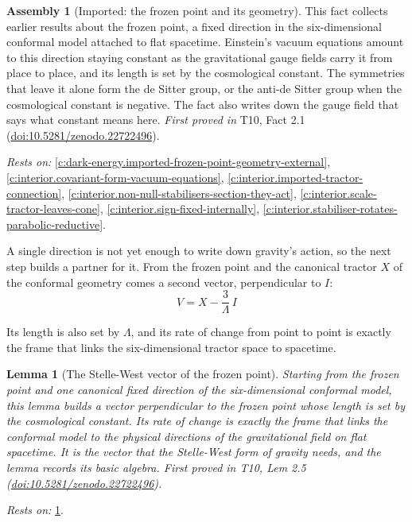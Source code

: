 \documentclass[11pt]{article}
\newtheorem{lemma}[theorem]{Lemma}
\theoremstyle{definition}
\newtheorem{assembled}[theorem]{Assembly}
\theoremstyle{plain}
\begin{document}
\begin{assembled}[Imported: the frozen point and its geometry]\label{c:dark-energy.imported-frozen-point-geometry}
This fact collects earlier results about the frozen point, a fixed direction in the six-dimensional conformal model attached to flat spacetime. Einstein's vacuum equations amount to this direction staying constant as the gravitational gauge fields carry it from place to place, and its length is set by the cosmological constant. The symmetries that leave it alone form the de Sitter group, or the anti-de Sitter group when the cosmological constant is negative. The fact also writes down the gauge field that says what constant means here.
\emph{First proved in} T10, Fact 2.1 (\href{https://doi.org/10.5281/zenodo.22722496}{doi:10.5281/zenodo.22722496}).
\end{assembled}
\noindent\emph{Rests on:} \ref{c:dark-energy.imported-frozen-point-geometry-external}, \ref{c:interior.covariant-form-vacuum-equations}, \ref{c:interior.imported-tractor-connection}, \ref{c:interior.non-null-stabilisers-section-they-act}, \ref{c:interior.scale-tractor-leaves-cone}, \ref{c:interior.sign-fixed-internally}, \ref{c:interior.stabiliser-rotates-parabolic-reductive}.

A single direction is not yet enough to write down gravity's action, so the next step builds a partner for it. From the frozen point and the canonical tractor $X$ of the conformal geometry comes a second vector, perpendicular to $I$: \[ V = X - \frac{3}{\Lambda}\, I \]

Its length is also set by $\Lambda$, and its rate of change from point to point is exactly the frame that links the six-dimensional tractor space to spacetime.

\begin{lemma}[The Stelle-West vector of the frozen point]\label{c:dark-energy.stelle-west-vector-frozen-point}
Starting from the frozen point and one canonical fixed direction of the six-dimensional conformal model, this lemma builds a vector perpendicular to the frozen point whose length is set by the cosmological constant. Its rate of change is exactly the frame that links the conformal model to the physical directions of the gravitational field on flat spacetime. It is the vector that the Stelle-West form of gravity needs, and the lemma records its basic algebra.
\emph{First proved in} T10, Lem 2.5 (\href{https://doi.org/10.5281/zenodo.22722496}{doi:10.5281/zenodo.22722496}).
\end{lemma}
\noindent\emph{Rests on:} \ref{c:dark-energy.imported-frozen-point-geometry}.
\end{document}
